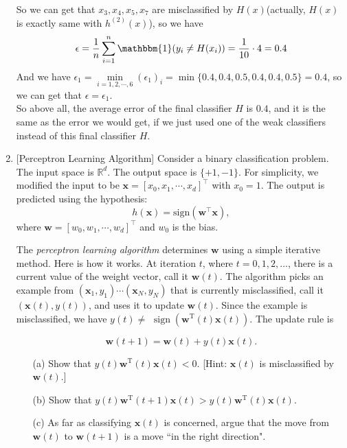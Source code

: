 \documentclass[10pt]{article}
\begin{document}
\begin{enumerate}[1.]
So we can get that $x_3, x_4, x_5, x_7$ are misclassified by $H(x)$(actually, $H(x)$ is exactly same with $h^{(2)}(x)$), so we have
$$\epsilon=\dfrac{1}{n}\sum_{i=1}^n\mathbbm{1}(y_i\neq H(x_i))=\dfrac{1}{10}\cdot 4=0.4$$
And we have $\epsilon_1=\min\limits_{i=1,2,\cdots,6}(\epsilon_1)_i=\min\{0.4, 0.4, 0.5, 0.4, 0.4, 0.5\}=0.4$,
so we can get that $\epsilon=\epsilon_1$.\\

So above all, the average error of the final classifier $H$ is $0.4$, and it is the same as the error we would get, if we just used one of the weak classifiers instead of this final classifier $H$.\\
        
\newpage

	\item {} [Perceptron Learning Algorithm]
            Consider a binary classification problem. The input space is $\mathbb{R}^{d}$. The output space is $\{ +1, -1 \}$. For simplicity, we modified the input to be $\mathbf{x} = [x_0, x_1, \cdots, x_d]^{\intercal}$ with $x_0=1$. The output is predicted using the hypothesis:
            \begin{equation}
                h(\mathbf{x}) = \text{sign}(\mathbf{w}^{\intercal}\mathbf{x}),
            \end{equation}
            where $\mathbf{w} = [w_0, w_1, \cdots, w_d]^{\intercal}$ and $w_0$ is the bias.
            
            The \textit{perceptron learning algorithm} determines $\mathbf{w}$ using a simple iterative method. Here is how it works. At iteration $t$, where $t=0,1,2, \ldots$, there is a current value of the weight vector, call it $\mathbf{w}(t)$. The algorithm picks an example from $\left(\mathbf{x}_1, y_1\right) \cdots\left(\mathbf{x}_N, y_N\right)$ that is currently misclassified, call it $(\mathbf{x}(t), y(t))$, and uses it to update $\mathbf{w}(t)$. Since the example is misclassified, we have $y(t) \neq$ $\operatorname{sign}\left(\mathbf{w}^{\mathrm{T}}(t) \mathbf{x}(t)\right)$. The update rule is

            \begin{equation}
                \mathbf{w}(t+1)=\mathbf{w}(t)+y(t) \mathbf{x}(t).    
            \end{equation}

                
		\begin{itemize}
			\item[(a)] Show that $y(t) \mathbf{w}^{\mathrm{T}}(t) \mathbf{x}(t)<0$. [Hint: $\mathbf{x}(t)$ is misclassified by $\mathbf{w}(t)$.]~ 
			\item[(b)] Show that $y(t) \mathbf{w}^{\mathrm{T}}(t+1) \mathbf{x}(t)>y(t) \mathbf{w}^{\mathrm{T}}(t) \mathbf{x}(t)$.~ 
			\item[(c)]   As far as classifying $\mathbf{x}(t)$ is concerned, argue that the move from $\mathbf{w}(t)$ to $\mathbf{w}(t+1)$ is a move ``in the right direction".~ 
		\end{itemize}


\end{enumerate}
\end{document}

